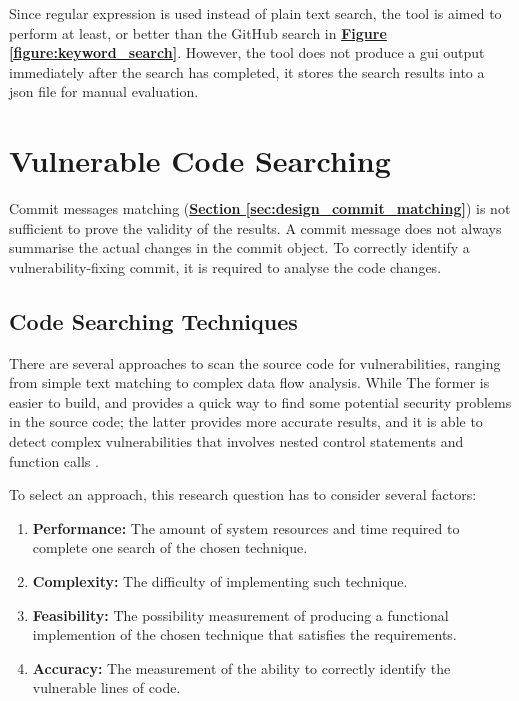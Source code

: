 \documentclass[12pt, a4paper]{report}
\begin{document}
Since regular expression is used instead of plain text search, the tool is aimed to perform at
least, or better than the GitHub search in \hyperref[figure:keyword_search]{\textbf{Figure
\ref*{figure:keyword_search}}}. However, the tool does not produce a \acrshort{gui} output
immediately after the search has completed, it stores the search results into a \acrshort{json} file
for manual evaluation.

\section{Vulnerable Code Searching} \label{sec:design_vuln_code_search}
Commit messages matching (\hyperref[sec:design_commit_matching]{\textbf{Section
\ref*{sec:design_commit_matching}}}) is not sufficient to prove the validity of the results. A
commit message does not always summarise the actual changes in the commit object. To correctly
identify a vulnerability-fixing commit, it is required to analyse the code changes.

\subsection{Code Searching Techniques}
There are several approaches to scan the source code for vulnerabilities, ranging from simple text
matching to complex data flow analysis. While The former is easier to build, and provides a quick
way to find some potential security problems in the source code; the latter provides more accurate
results, and it is able to detect complex vulnerabilities that involves nested control statements
and function calls \cite{castro_2006}.

To select an approach, this research question has to consider several factors:
\begin{enumerate} \label{subsec:code_searching}
  \item \textbf{Performance:} The amount of system resources and time required to complete one
  search of the chosen technique.
  \item \textbf{Complexity:} The difficulty of implementing such technique.
  \item \textbf{Feasibility:} The possibility measurement of producing a functional implemention of
  the chosen technique that satisfies the requirements.
  \item \textbf{Accuracy:} The measurement of the ability to correctly identify the vulnerable lines
  of code.
\end{enumerate}
\end{document}
